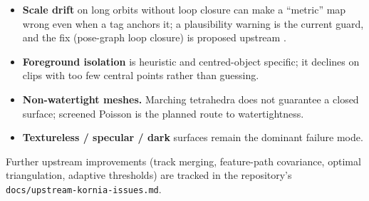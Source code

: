 \documentclass[11pt,a4paper]{article}
\newcommand{\code}[1]{\texttt{#1}}
\begin{document}
\begin{itemize}[leftmargin=1.5em]
\item \textbf{Scale drift} on long orbits without loop closure can make a ``metric'' map wrong
even when a tag anchors it; a plausibility warning is the current guard, and the fix (pose-graph
loop closure) is proposed upstream \cite{loopclosure}.
\item \textbf{Foreground isolation} is heuristic and centred-object specific; it declines on
clips with too few central points rather than guessing.
\item \textbf{Non-watertight meshes.} Marching tetrahedra does not guarantee a closed surface;
screened Poisson \cite{kazhdan2013} is the planned route to watertightness.
\item \textbf{Textureless / specular / dark} surfaces remain the dominant failure mode.
\end{itemize}

Further upstream improvements (track merging, feature-path covariance, optimal triangulation,
adaptive thresholds) are tracked in the repository's \code{docs/upstream-kornia-issues.md}.
\end{document}
